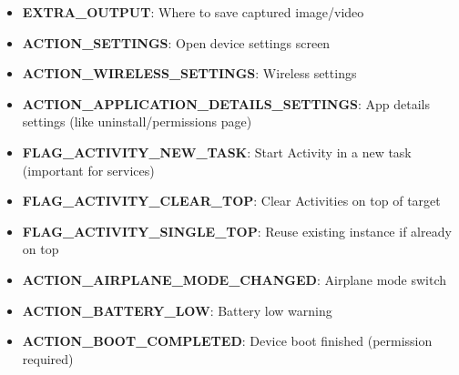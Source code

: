\documentclass{report}
\begin{document}
\begin{itemize}
\begin{itemize}
                \item \textbf{EXTRA\_OUTPUT}:	Where to save captured image/video
                \item \textbf{ACTION\_SETTINGS}:	Open device settings screen
                \item \textbf{ACTION\_WIRELESS\_SETTINGS}:	Wireless settings
                \item \textbf{ACTION\_APPLICATION\_DETAILS\_SETTINGS}:	App details settings (like uninstall/permissions page)
                \item \textbf{FLAG\_ACTIVITY\_NEW\_TASK}:	Start Activity in a new task (important for services)
                \item \textbf{FLAG\_ACTIVITY\_CLEAR\_TOP}:	Clear Activities on top of target
                \item \textbf{FLAG\_ACTIVITY\_SINGLE\_TOP}:	Reuse existing instance if already on top
                \item \textbf{ACTION\_AIRPLANE\_MODE\_CHANGED}:	Airplane mode switch
                \item \textbf{ACTION\_BATTERY\_LOW}:	Battery low warning
                \item \textbf{ACTION\_BOOT\_COMPLETED}:	Device boot finished (permission required)
            \end{itemize}
    \end{itemize}

    \pagebreak 
\end{document}
